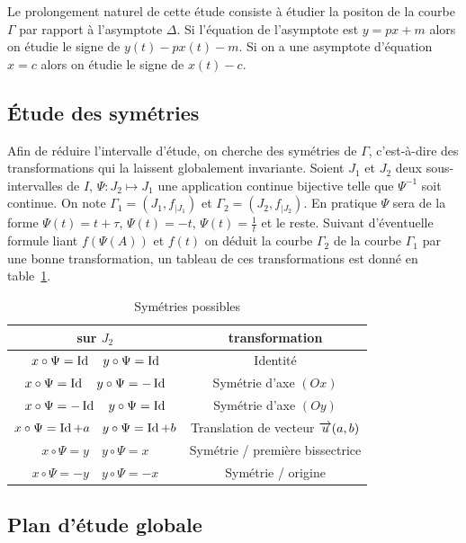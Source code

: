 Le prolongement naturel de cette étude consiste à étudier la positon de la 
courbe \(\Gamma\) par rapport à l'asymptote \(\Delta\). Si l'équation de 
l'asymptote est \(y = px + m\) alors on étudie le signe de \(y(t) - px(t) - m\).  
Si on a une asymptote d'équation \(x = c\) alors on étudie le signe de \(x(t) - 
c\).

\subsection{Étude des symétries}

Afin de réduire l'intervalle d'étude, on cherche des symétries de \(\Gamma\), 
c'est-à-dire des transformations qui la laissent globalement invariante. Soient 
\(J_1\) et \(J_2\) deux sous-intervalles de \(I\), \(\Psi:J_2 \longmapsto J_1\) 
une application continue bijective telle que \(\Psi^{-1}\) soit continue. On 
note \(\Gamma_1 = (J_1, f_{|J_1})\) et \(\Gamma_2 = (J_2, f_{|J_2})\). En 
pratique \(\Psi\) sera de la forme \(\Psi(t)=t + \tau\), \(\Psi(t)=-t\), 
\(\Psi(t)=\frac{1}{t}\) et le reste. Suivant d'éventuelle formule liant 
\(f(\Psi(A))\) et \(f(t)\) on déduit la courbe \(\Gamma_2\) de la courbe 
\(\Gamma_1\) par une bonne transformation, un tableau de ces transformations est 
donné en table~\ref{tab:sym}.

\begin{table}
  \centering
  \begin{tabular}{|c|c|} \hline
    sur \( J_2\) & transformation \\ \hline
    \(x \circ \Psi = \operatorname{Id} \quad y \circ \Psi = \operatorname{Id}\) &Identité \\ \hline
    \(x \circ \Psi = \operatorname{Id} \quad y \circ \Psi = -\operatorname{Id}\) &Symétrie d'axe \((Ox)\) \\ 
    \hline
    \(x \circ \Psi = -\operatorname{Id} \quad y \circ \Psi = \operatorname{Id}\) &Symétrie d'axe \((Oy)\) \\ 
    \hline
    \(x \circ \Psi = \operatorname{Id} + a \quad y \circ \Psi = \operatorname{Id} + b\) & Translation de 
    vecteur \(\overrightarrow{u}(a, b)\)\\ \hline
    \(x \circ \Psi = y \quad y \circ \Psi = x\) & Symétrie / première 
    bissectrice\\ \hline
    \(x \circ \Psi = -y \quad y \circ \Psi = -x\) & Symétrie / origine\\ \hline
  \end{tabular}
  \caption{Symétries possibles}
  \label{tab:sym}
\end{table}

\subsection{Plan d'étude globale}

